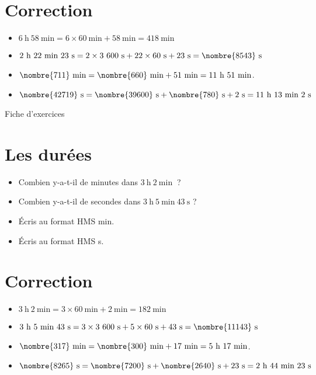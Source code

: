 \documentclass[a4paper,11pt,fleqn]{article}
\begin{document}
\section{Correction}
\begin{itemize}
 \item $6~\text{h}~58~\text{min}=6\times60~\text{min}+58~\text{min}=418~\text{min}$
  \item $2~\text{h}~22~\text{min}~23~\text{s}=2\times3~600~\text{s}+22\times60~\text{s}+23~\text{s}=\nombre{8543}~\text{s}$
  \item $\nombre{711}~\text{min}=\nombre{660}~\text{min}+51~\text{min}=11~\text{h}~51~\text{min}$.
  \item $\nombre{42719}~\text{s}=\nombre{39600}~\text{s}+\nombre{780}~\text{s}+2~\text{s}=11~\text{h}~13~\text{min}~2~\text{s}$ \end{itemize}


\newpage
\setcounter{exo}{0}
\setcounter{section}{0}
\begin{center}
	{\huge Fiche d'exercices } 	
\end{center}


\section{Les durées}
\begin{itemize}
  \item Combien y-a-t-il de minutes dans $3~\text{h}~2~\text{min}~$ ?
  \item Combien y-a-t-il de secondes dans $3~\text{h}~5~\text{min}~43~\text{s}$ ?
  \item Écris au format HMS  min.
  \item Écris au format HMS  s.
\end{itemize}

\section{Correction}
\begin{itemize}
 \item $3~\text{h}~2~\text{min}=3\times60~\text{min}+2~\text{min}=182~\text{min}$
  \item $3~\text{h}~5~\text{min}~43~\text{s}=3\times3~600~\text{s}+5\times60~\text{s}+43~\text{s}=\nombre{11143}~\text{s}$
  \item $\nombre{317}~\text{min}=\nombre{300}~\text{min}+17~\text{min}=5~\text{h}~17~\text{min}$.
  \item $\nombre{8265}~\text{s}=\nombre{7200}~\text{s}+\nombre{2640}~\text{s}+23~\text{s}=2~\text{h}~44~\text{min}~23~\text{s}$ \end{itemize}
\end{document}
